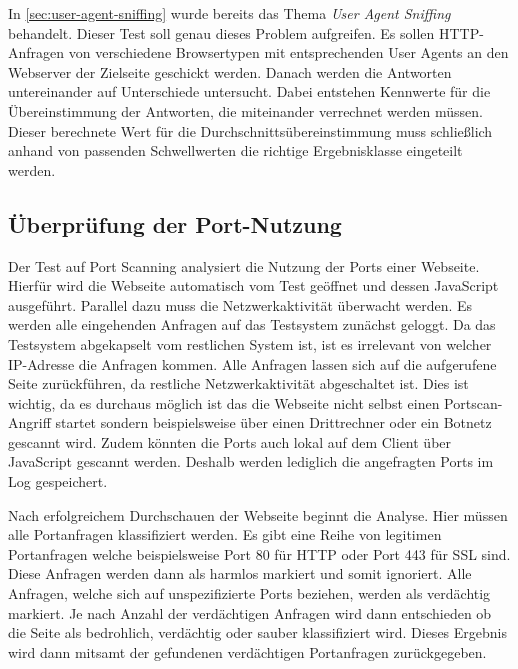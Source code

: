 In \autoref{sec:user-agent-sniffing} wurde bereits das Thema \textit{User Agent Sniffing} behandelt.
Dieser Test soll genau dieses Problem aufgreifen.
Es sollen \ac{HTTP}-Anfragen von verschiedene Browsertypen mit entsprechenden User Agents an den Webserver der Zielseite geschickt werden.
Danach werden die Antworten untereinander auf Unterschiede untersucht. Dabei entstehen Kennwerte für die Übereinstimmung der Antworten, die miteinander verrechnet werden müssen.
Dieser berechnete Wert für die Durchschnittsübereinstimmung muss schließlich anhand von passenden Schwellwerten die richtige Ergebnisklasse eingeteilt werden.

\subsection{Überprüfung der Port-Nutzung}
Der Test auf Port Scanning analysiert die Nutzung der Ports einer Webseite. Hierfür wird die Webseite automatisch vom Test geöffnet und dessen JavaScript ausgeführt. Parallel dazu muss die Netzwerkaktivität überwacht werden. Es werden alle eingehenden Anfragen auf das Testsystem zunächst geloggt. Da das Testsystem abgekapselt vom restlichen System ist, ist es irrelevant von welcher IP-Adresse die Anfragen kommen. Alle Anfragen lassen sich auf die aufgerufene Seite zurückführen, da restliche Netzwerkaktivität abgeschaltet ist. Dies ist wichtig, da es durchaus möglich ist das die Webseite nicht selbst einen Portscan-Angriff startet sondern beispielsweise über einen Drittrechner oder ein Botnetz gescannt wird. Zudem könnten die Ports auch lokal auf dem Client über JavaScript gescannt werden. Deshalb werden lediglich die angefragten Ports im Log gespeichert.

Nach erfolgreichem Durchschauen der Webseite beginnt die Analyse. Hier müssen alle Portanfragen klassifiziert werden. Es gibt eine Reihe von legitimen Portanfragen welche beispielsweise Port 80 für HTTP oder Port 443 für SSL sind. Diese Anfragen werden dann als harmlos markiert und somit ignoriert. Alle Anfragen, welche sich auf unspezifizierte Ports beziehen, werden als verdächtig markiert. Je nach Anzahl der verdächtigen Anfragen wird dann entschieden ob die Seite als bedrohlich, verdächtig oder sauber klassifiziert wird. Dieses Ergebnis wird dann mitsamt der gefundenen verdächtigen Portanfragen zurückgegeben.


